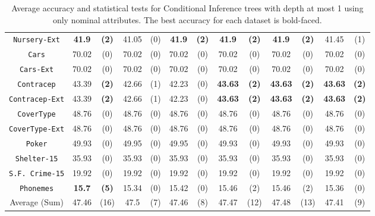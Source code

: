 \begin{table*}
\begin{tabular}{c|cc|cc|cc|cc|cc|cc}
{\tt Nursery-Ext}  &{\bf 41.9}  & {\bf (2)} & 41.05       & (0)       & {\bf 41.9}  & {\bf (2)} & {\bf 41.9}  & {\bf (2)} & {\bf 41.9}  & {\bf (2)} & 41.45       & (1)       \\
{\tt Cars}         &70.02       & (0)       & 70.02       & (0)       & 70.02       & (0)       & 70.02       & (0)       & 70.02       & (0)       & 70.02       & (0)       \\
{\tt Cars-Ext}     &70.02       & (0)       & 70.02       & (0)       & 70.02       & (0)       & 70.02       & (0)       & 70.02       & (0)       & 70.02       & (0)       \\
{\tt Contracep}    &43.39       & {\bf (2)} & 42.66       & (1)       & 42.23       & (0)       & {\bf 43.63} & {\bf (2)} & {\bf 43.63} & {\bf (2)} & {\bf 43.63} & {\bf (2)} \\
{\tt Contracep-Ext}&43.39       & {\bf (2)} & 42.66       & (1)       & 42.23       & (0)       & {\bf 43.63} & {\bf (2)} & {\bf 43.63} & {\bf (2)} & {\bf 43.63} & {\bf (2)} \\
{\tt CoverType}    &48.76       & (0)       & 48.76       & (0)       & 48.76       & (0)       & 48.76       & (0)       & 48.76       & (0)       & 48.76       & (0)       \\
{\tt CoverType-Ext}&48.76       & (0)       & 48.76       & (0)       & 48.76       & (0)       & 48.76       & (0)       & 48.76       & (0)       & 48.76       & (0)       \\
{\tt Poker}        &49.93       & (0)       & 49.95       & (0)       & 49.95       & (0)       & 49.93       & (0)       & 49.93       & (0)       & 49.93       & (0)       \\  
{\tt Shelter-15}   &35.93       & (0)       & 35.93       & (0)       & 35.93       & (0)       & 35.93       & (0)       & 35.93       & (0)       & 35.93       & (0)       \\   
{\tt S.F. Crime-15}&19.92       & (0)       & 19.92       & (0)       & 19.92       & (0)       & 19.92       & (0)       & 19.92       & (0)       & 19.92       & (0)       \\ 
{\tt Phonemes}     &{\bf 15.7}  & {\bf (5)} & 15.34       & (0)       & 15.42       & (0)       & 15.46       & (2)       & 15.46       & (2)       & 15.36       & (0)       \\ 
\hline
Average (Sum)      & 47.46      & (16)      & 47.5        & (7)       & 47.46       & (8)       & 47.47       & (12)       & 47.48       & (13)      & 47.41      & (9)
\end{tabular}
\caption{Average accuracy and statistical tests  for  Conditional Inference trees with depth at most 1 using only nominal attributes. The best accuracy for each dataset is bold-faced.}
\label{tab:ctree-1}
\end{table*}


